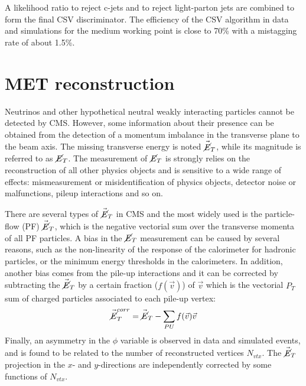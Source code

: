 A likelihood ratio to reject c-jets and to reject light-parton jets are combined to form the final CSV discriminator. The efficiency of the CSV algorithm in data and simulations for the medium working point is close to 70\% with a mistagging rate of about 1.5\%.

\section{MET reconstruction}\label{sec:MET}

Neutrinos and other hypothetical neutral weakly interacting particles cannot be detected by CMS. However, some information about their presence can be obtained from
the detection of a momentum imbalance in the transverse plane to the beam axis. The missing transverse energy is noted $\vec{\cancel{E}}_T$, while its magnitude is referred to as $\cancel{E}_T$. The measurement of $\cancel{E}_T$ is strongly relies on the reconstruction of all other physics objects and is sensitive to a wide range of effects: mismeasurement or misidentification of physics objects, detector noise or malfunctions, pileup interactions and so on.

There are several types of $\vec{\cancel{E}}_T$ in CMS and the most widely used is the particle-flow (PF) $\vec{\cancel{E}}_T$, which is the negative vectorial sum over the transverse momenta of all PF particles. A bias in the $\cancel{E}_T$ measurement can be caused by several reasons, such as the non-linearity of the response of the calorimeter for hadronic particles, or the minimum energy thresholds in the calorimeters. In addition, another bias comes from the pile-up interactions and it can be corrected by subtracting the $\vec{\cancel{E}}_T$ by a certain fraction ($f(\vec{v})$) of $\vec{v}$ which is the vectorial $P_{T}$ sum of charged particles associated to each pile-up vertex:
\begin{equation}
\vec{\cancel{E}}_T^{corr} = \vec{\cancel{E}}_T - \sum_{PU} f(\vec{v}) \vec{v}
\end{equation}
Finally, an asymmetry in the $\phi$ variable is observed in data and simulated events, and is found to be related to the number of reconstructed vertices $N_{vtx}$. The $\vec{\cancel{E}}_T$ projection in the $x$- and $y$-directions are independently corrected by some functions of $N_{vtx}$.\\

